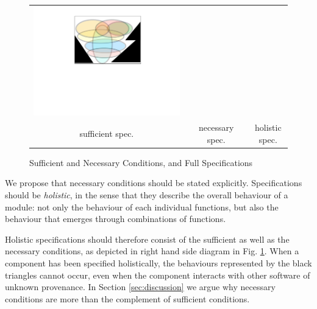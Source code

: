 \begin{figure}[htb]
\begin{tabular}{ccccc}
\begin{minipage}{0.25\textwidth}
 \includegraphics[width=\linewidth, trim=250  320 260 60,clip]{diagrams/NecAndSuff.pdf}
\end{minipage}
\\
sufficient  spec.& & necessary spec. & & holistic spec.
 \end{tabular}
  \vspace*{-2.5mm}
  \caption{Sufficient and Necessary Conditions, and Full Specifications}
 \label{fig:NecessaryAndSuff}
 \end{figure}
 
 We propose that  necessary conditions should be stated
 explicitly. Specifications should be \emph{holistic}, in the sense
 that they describe the  overall behaviour of a module: not only the
 behaviour of each individual functions, but also the 
 behaviour that emerges through combinations of functions.

Holistic specifications should therefore consist of   the sufficient as well as the necessary conditions, as  
depicted in right hand side  diagram in Fig. \ref{fig:NecessaryAndSuff}.
When a component has been specified holistically,  the behaviours
represented by the black triangles cannot occur, even when the
component interacts with other software of unknown provenance.
In Section \ref{sec:discussion} we argue why necessary conditions are more than the complement of
sufficient conditions.

